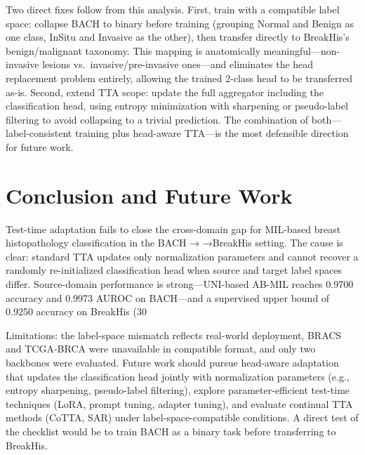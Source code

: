 \documentclass[conference]{IEEEtran}
\begin{document}
Two direct fixes follow from this analysis. First, train with a compatible label space: collapse BACH to binary before training (grouping Normal and Benign as one class, InSitu and Invasive as the other), then transfer directly to BreakHis's benign/malignant taxonomy. This mapping is anatomically meaningful---non-invasive lesions vs.\ invasive/pre-invasive ones---and eliminates the head replacement problem entirely, allowing the trained 2-class head to be transferred as-is. Second, extend TTA scope: update the full aggregator including the classification head, using entropy minimization with sharpening \cite{niu2023towards} or pseudo-label filtering to avoid collapsing to a trivial prediction. The combination of both---label-consistent training plus head-aware TTA---is the most defensible direction for future work.

\section{Conclusion and Future Work}
\label{sec:conclusion}

Test-time adaptation fails to close the cross-domain gap for MIL-based breast histopathology classification in the BACH
→
→BreakHis setting. The cause is clear: standard TTA updates only normalization parameters and cannot recover a randomly re-initialized classification head when source and target label spaces differ. Source-domain performance is strong—UNI-based AB-MIL reaches 0.9700 accuracy and 0.9973 AUROC on BACH—and a supervised upper bound of 0.9250 accuracy on BreakHis (30%

Limitations: the label-space mismatch reflects real-world deployment, BRACS and TCGA-BRCA were unavailable in compatible format, and only two backbones were evaluated. Future work should pursue head-aware adaptation that updates the classification head jointly with normalization parameters (e.g., entropy sharpening, pseudo-label filtering), explore parameter-efficient test-time techniques (LoRA, prompt tuning, adapter tuning), and evaluate continual TTA methods (CoTTA, SAR) under label-space-compatible conditions. A direct test of the checklist would be to train BACH as a binary task before transferring to BreakHis.



\end{document}
